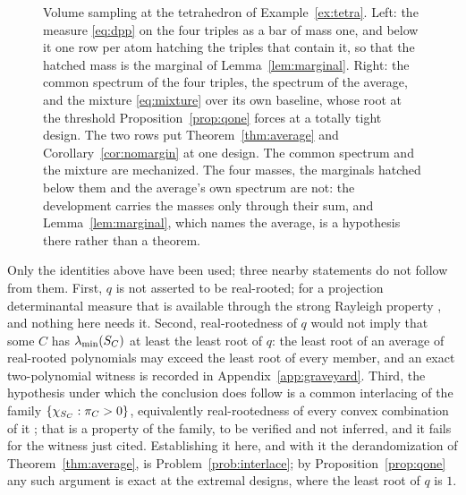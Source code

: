 \begin{figure}[ht]
  \centering
  
  \caption{Volume sampling at the tetrahedron of Example~\ref{ex:tetra}.  Left:
  the measure \eqref{eq:dpp} on the four triples as a bar of mass one, and below
  it one row per atom hatching the triples that contain it, so that the hatched
  mass is the marginal of Lemma~\ref{lem:marginal}.  Right: the common spectrum
  of the four triples, the spectrum of the average, and the mixture
  \eqref{eq:mixture} over its own baseline, whose root at the threshold
  Proposition~\ref{prop:qone} forces at a totally tight design.  The two rows
  put Theorem~\ref{thm:average} and Corollary~\ref{cor:nomargin} at one design.
  The common spectrum and the mixture are mechanized.  The four masses, the
  marginals hatched below them and the average's own spectrum are not: the
  development carries the masses only through their sum, and
  Lemma~\ref{lem:marginal}, which names the average, is a hypothesis there
  rather than a theorem.}
  \label{fig:mixture}
\end{figure}

\begin{remark}\label{rem:interlace}
Only the identities above have been used; three nearby statements do
not follow from them.  First, $q$ is not asserted to
be real-rooted; for a projection determinantal measure that is available
through the strong Rayleigh property
\cite{BorceaBrandenLiggett2009,AnariOveisGharan2015}, and nothing here
needs it.  Second, real-rootedness of $q$ would not imply that some $C$
has $\lambda_{\min}(S_{C})$ at least the least root of $q$: the least root of an
average of real-rooted polynomials may exceed the least root of every
member, and an exact two-polynomial witness is recorded in
Appendix~\ref{app:graveyard}.  Third, the hypothesis under which the
conclusion does follow is a common interlacing of the family
$\{\chi_{S_{C}}:\pi_C>0\}$, equivalently real-rootedness of every convex
combination of it \cite{MSS2015}; that is a property of the family, to be
verified and not inferred, and it fails for the witness just cited.
Establishing it here, and with it the derandomization of
Theorem~\ref{thm:average}, is Problem~\ref{prob:interlace}; by
Proposition~\ref{prop:qone} any such argument is exact at the extremal
designs, where the least root of $q$ is $1$.
\end{remark}
